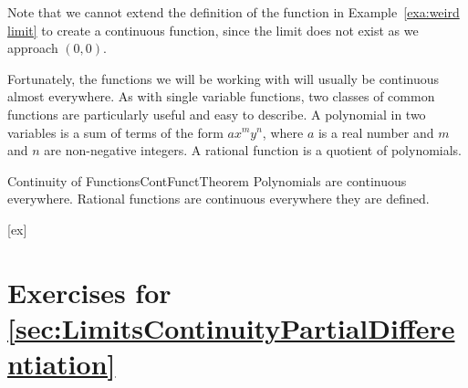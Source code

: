 Note that we cannot extend the definition of the function in Example~\ref{exa:weird limit}
to create a continuous function, since the limit does not exist as we approach $(0,0)$.

Fortunately, the functions we will be working with will usually be
continuous almost everywhere.
As with single variable functions, two classes of common functions are
particularly useful and easy to describe. A
polynomial in two
variables is a sum of terms of the form $ax^my^n$, where $a$ is a real
number and $m$ and $n$ are non-negative integers. A rational
function
is a quotient of polynomials.

\begin{theorem}{Continuity of Functions}{ContFunctTheorem}
Polynomials are continuous everywhere. Rational functions are
continuous everywhere they are defined.
\end{theorem}


[ex]
\section*{Exercises for \ref{sec:LimitsContinuityPartialDifferentiation}}

